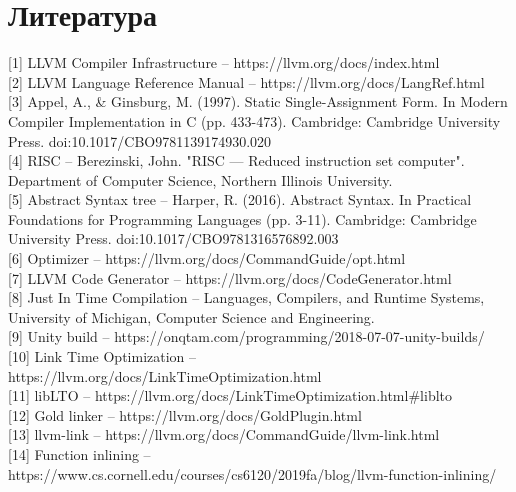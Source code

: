 \documentclass[12pt,oneside]{memoir}
\begin{document}
\chapter{Литература}
[1] LLVM Compiler Infrastructure -- https://llvm.org/docs/index.html \\

[2] LLVM Language Reference Manual -- https://llvm.org/docs/LangRef.html \\

[3] Appel, A., {\&} Ginsburg, M. (1997). Static Single-Assignment Form. 
     In Modern Compiler Implementation in C (pp. 433-473).  
   Cambridge: Cambridge University Press. doi:10.1017/CBO9781139174930.020 \\
 
[4] RISC --  Berezinski, John. "RISC — Reduced instruction set computer". Department of Computer Science, Northern Illinois University.  \\

[5] Abstract Syntax tree -- 
Harper, R. (2016). Abstract Syntax. In Practical Foundations for Programming Languages (pp. 3-11). Cambridge: Cambridge University Press. doi:10.1017/CBO9781316576892.003
\\

[6] Optimizer -- https://llvm.org/docs/CommandGuide/opt.html \\

[7] LLVM Code Generator -- https://llvm.org/docs/CodeGenerator.html \\

[8] Just In Time Compilation  -- Languages, Compilers, and Runtime Systems, University of Michigan, Computer Science and Engineering. \\

[9] Unity build -- https://onqtam.com/programming/2018-07-07-unity-builds/ \\ 

[10] Link Time Optimization -- https://llvm.org/docs/LinkTimeOptimization.html \\

[11] libLTO -- https://llvm.org/docs/LinkTimeOptimization.html{\#}liblto \\

[12] Gold linker -- https://llvm.org/docs/GoldPlugin.html \\

[13] llvm-link -- https://llvm.org/docs/CommandGuide/llvm-link.html \\

[14] Function inlining -- https://www.cs.cornell.edu/courses/cs6120/2019fa/blog/llvm-function-inlining/ \\
\end{document}
